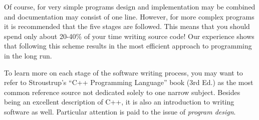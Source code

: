 Of course, for very simple programs design and implementation may be
combined and documentation may consist of one line.  However, for more
complex programs it is recommended that the five stages are
followed. This means that you should spend only about 20-40\% of your
time writing source code!  Our experience shows that following this
scheme results in the most efficient approach to programming in the
long run.

To learn more on each stage of the software writing process, you may
want to refer to Stroustrup's ``C++ Programming Language'' book (3rd
Ed.) as the most common reference source not dedicated solely to one
narrow subject. Besides being an excellent description of C++, it is
also an introduction to writing software as well. Particular attention
is paid to the issue of {\em program design}.

